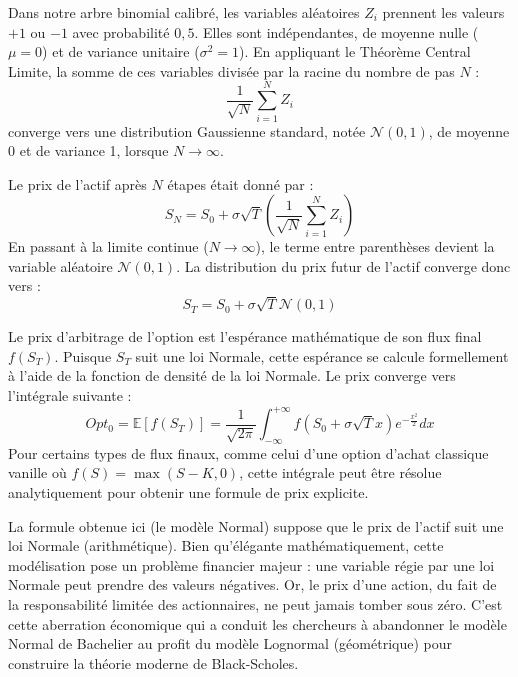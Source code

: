 \begin{intuitionbox}
Dans notre arbre binomial calibré, les variables aléatoires $Z_i$ prennent les valeurs $+1$ ou $-1$ avec probabilité $0,5$. Elles sont indépendantes, de moyenne nulle ($\mu = 0$) et de variance unitaire ($\sigma^2 = 1$).
En appliquant le Théorème Central Limite, la somme de ces variables divisée par la racine du nombre de pas $N$ :
\begin{equation*}
    \frac{1}{\sqrt{N}} \sum_{i=1}^{N} Z_i
\end{equation*}
converge vers une distribution Gaussienne standard, notée $\mathcal{N}(0,1)$, de moyenne 0 et de variance 1, lorsque $N \to \infty$.
\end{intuitionbox}

\begin{definitionbox}
Le prix de l'actif après $N$ étapes était donné par :
\begin{equation*}
    S_N = S_0 + \sigma \sqrt{T} \left( \frac{1}{\sqrt{N}} \sum_{i=1}^{N} Z_i \right)
\end{equation*}
En passant à la limite continue ($N \to \infty$), le terme entre parenthèses devient la variable aléatoire $\mathcal{N}(0,1)$. La distribution du prix futur de l'actif converge donc vers :
\begin{equation*}
    S_T = S_0 + \sigma \sqrt{T} \mathcal{N}(0,1)
\end{equation*}

Le prix d'arbitrage de l'option est l'espérance mathématique de son flux final $f(S_T)$. Puisque $S_T$ suit une loi Normale, cette espérance se calcule formellement à l'aide de la fonction de densité de la loi Normale.
Le prix converge vers l'intégrale suivante :
\begin{equation*}
    Opt_0 = \mathbb{E}[f(S_T)] = \frac{1}{\sqrt{2\pi}} \int_{-\infty}^{+\infty} f(S_0 + \sigma \sqrt{T} x) e^{-\frac{x^2}{2}} dx
\end{equation*}
Pour certains types de flux finaux, comme celui d'une option d'achat classique vanille où $f(S) = \max(S - K, 0)$, cette intégrale peut être résolue analytiquement pour obtenir une formule de prix explicite.
\end{definitionbox}

\begin{remarquebox}
La formule obtenue ici (le modèle Normal) suppose que le prix de l'actif suit une loi Normale (arithmétique). Bien qu'élégante mathématiquement, cette modélisation pose un problème financier majeur : une variable régie par une loi Normale peut prendre des valeurs négatives. Or, le prix d'une action, du fait de la responsabilité limitée des actionnaires, ne peut jamais tomber sous zéro. C'est cette aberration économique qui a conduit les chercheurs à abandonner le modèle Normal de Bachelier au profit du modèle Lognormal (géométrique) pour construire la théorie moderne de Black-Scholes.
\end{remarquebox}

